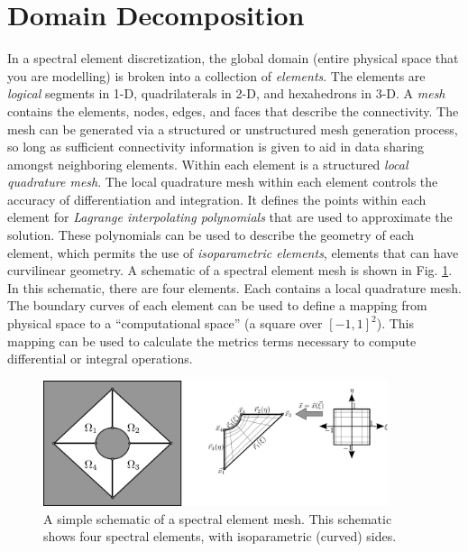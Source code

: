 \documentclass[12pt]{softwaremanual}
\begin{document}
\section{Domain Decomposition}
   In a spectral element discretization, the global domain (entire physical space that you are modelling) is broken into a collection of \textit{elements}. The elements are \textit{logical} segments in 1-D, quadrilaterals in 2-D, and hexahedrons in 3-D. A \textit{mesh} contains the elements, nodes, edges, and faces that describe the connectivity. The mesh can be generated via a structured or unstructured mesh generation process, so long as sufficient connectivity information is given to aid in data sharing amongst neighboring elements. Within each element is a structured \textit{local quadrature mesh}. The local quadrature mesh within each element controls the accuracy of differentiation and integration. It defines the points within each element for \textit{Lagrange interpolating polynomials} that are used to approximate the solution. These polynomials can be used to describe the geometry of each element, which permits the use of \textit{isoparametric elements}, elements that can have curvilinear geometry. A schematic of a spectral element mesh is shown in Fig. \ref{fig:simplemesh}. In this schematic, there are four elements. Each contains a local quadrature mesh. The boundary curves of each element can be used to define a mapping from physical space to a ``computational space'' (a square over $[-1,1]^2$). This mapping can be used to calculate the metrics terms necessary to compute differential or integral operations.
 
\begin{figure}
\begin{center}
   \includegraphics[width=0.9\textwidth]{../figures/geometry/meshDepiction2D-simple.png}
   \caption{A simple schematic of a spectral element mesh. This schematic shows four spectral elements, with isoparametric (curved) sides. }\label{fig:simplemesh}
\end{center}
\end{figure} 
 
\end{document}

